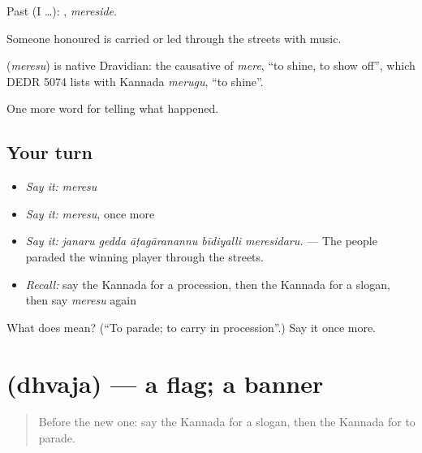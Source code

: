 Past (I …): , \emph{mereside}.

Someone honoured is carried or led through the streets with music.

\begin{cousinweb}
\textbf{} (\emph{meresu}) is native Dravidian: the causative of \emph{mere}, \textquotedblleft{}to shine, to show off\textquotedblright{}, which DEDR 5074 lists with Kannada \emph{merugu}, \textquotedblleft{}to shine\textquotedblright{}.
\end{cousinweb}

\begin{grammarlens}[title={What you've built}]
One more word for telling what happened.
\end{grammarlens}

\subsection*{Your turn}
\begin{itemize}
\raggedright
  \item \emph{Say it:} \emph{meresu}
  \item \emph{Say it:} \emph{meresu}, once more
  \item \emph{Say it:} \emph{janaru gedda āṭagāranannu bīdiyalli meresidaru.} — The people paraded the winning player through the streets.
  \item \emph{Recall:} say the Kannada for a procession, then the Kannada for a slogan, then say \emph{meresu} again
\end{itemize}

\begin{tcolorbox}[breakable,colback=teal!4,colframe=teal!35!black,title={Before you move on}]
What does  mean? (\textquotedblleft{}To parade; to carry in procession\textquotedblright{}.) Say it once more.
\end{tcolorbox}
\section[\texorpdfstring{\kn{ಧ್ವಜ} (dhvaja)}{ಧ್ವಜ (dhvaja)}]{ (dhvaja) — a flag; a banner}

\label{lesson:KA-C359-dhvaja}



\begin{quote}
Before the new one: say the Kannada for a slogan, then the Kannada for to parade.
\end{quote}

